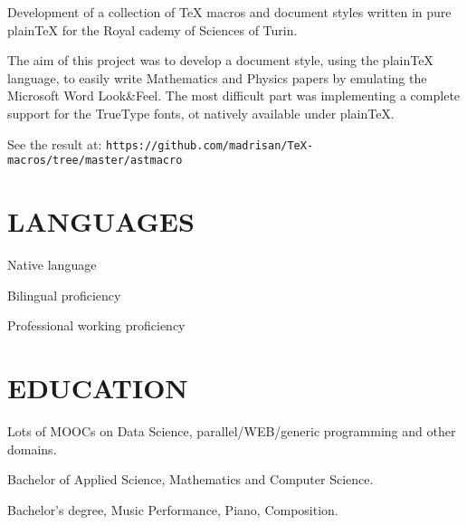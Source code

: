 
\bigskip

\noindent
Development of a collection of TeX macros and document styles written in pure plainTeX
for the Royal cademy of Sciences of Turin.

The aim of this project was to develop a document style, using the plainTeX language, 
to easily write Mathematics and Physics papers by emulating the Microsoft Word 
Look\&Feel.
The most difficult part was implementing a complete support for the TrueType fonts,
ot natively available under plain\TeX.

See the result at:
\hfill\break\noindent
{\tt https:/\negthinspace/github.com/madrisan/TeX-macros/tree/master/astmacro}


\section{LANGUAGES}

Native language

Bilingual proficiency

Professional working proficiency


\section{EDUCATION}

Lots of MOOCs on Data Science, parallel/WEB/generic programming and other domains.
\bigskip

Bachelor of Applied Science, Mathematics and Computer Science.
\bigskip

Bachelor's degree, Music Performance, Piano, Composition.


\def\certification#1#2{%
   \par\hang\noindent\line{\rm#1 -- #2\hss}\vskip 0pt\noindent\ignorespaces}

